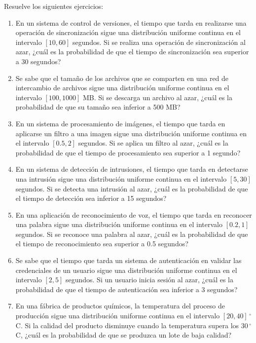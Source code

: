 \begin{Ejer}
Resuelve los siguientes ejercicios:
\begin{enumerate}


    \item En un sistema de control de versiones, el tiempo que tarda en realizarse una operación de sincronización sigue una distribución uniforme continua en el intervalo $[10, 60]$ segundos. Si se realiza una operación de sincronización al azar, ¿cuál es la probabilidad de que el tiempo de sincronización sea superior a 30 segundos?

    \item Se sabe que el tamaño de los archivos que se comparten en una red de intercambio de archivos sigue una distribución uniforme continua en el intervalo $[100, 1000]$ MB. Si se descarga un archivo al azar, ¿cuál es la probabilidad de que su tamaño sea inferior a 500 MB?

    \item En un sistema de procesamiento de imágenes, el tiempo que tarda en aplicarse un filtro a una imagen sigue una distribución uniforme continua en el intervalo $[0.5, 2]$ segundos. Si se aplica un filtro al azar, ¿cuál es la probabilidad de que el tiempo de procesamiento sea superior a 1 segundo?

    \item En un sistema de detección de intrusiones, el tiempo que tarda en detectarse una intrusión sigue una distribución uniforme continua en el intervalo $[5, 30]$ segundos. Si se detecta una intrusión al azar, ¿cuál es la probabilidad de que el tiempo de detección sea inferior a 15 segundos?

    \item En una aplicación de reconocimiento de voz, el tiempo que tarda en reconocer una palabra sigue una distribución uniforme continua en el intervalo $[0.2, 1]$ segundos. Si se reconoce una palabra al azar, ¿cuál es la probabilidad de que el tiempo de reconocimiento sea superior a 0.5 segundos?

    \item Se sabe que el tiempo que tarda un sistema de autenticación en validar las credenciales de un usuario sigue una distribución uniforme continua en el intervalo $[2, 5]$ segundos. Si un usuario inicia sesión al azar, ¿cuál es la probabilidad de que el tiempo de autenticación sea inferior a 3 segundos?

    \item En una fábrica de productos químicos, la temperatura del proceso de producción sigue una distribución uniforme continua en el intervalo $[20, 40]\,^\circ$C. Si la calidad del producto disminuye cuando la temperatura supera los $30\,^\circ$C, ¿cuál es la probabilidad de que se produzca un lote de baja calidad?


\end{enumerate}
\end{Ejer}
